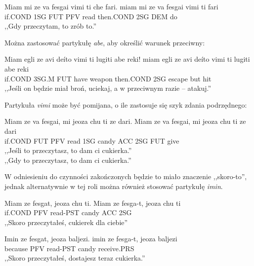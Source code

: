 \begin{spacing}{1.1}
\begin{exe}
	\ex
	\trans Miam mi ze va fesgai vimi ti che fari.
	\gll miam mi ze va fesgai vimi ti fari\\
	  if.COND 1SG FUT PFV read then.COND 2SG DEM do\\
	\glt  ,,Gdy przeczytam, to zrób to.''
\end{exe}

Można zastosować partykułę \emph{abe}, aby określić warunek przeciwny:

\begin{exe}
	\ex
	\trans Miam egli ze avi deíto vimi ti lugiti abe reki! 
	\gll miam egli ze avi deíto vimi ti lugiti abe reki\\
	  if.COND 3SG.M FUT have weapon then.COND 2SG escape but hit\\
	\glt  ,,Jeśli on będzie miał broń, uciekaj, a w przeciwnym razie -- atakuj.''
\end{exe}

Partykuła \emph{vimi} może być pomijana, o ile zastosuje się szyk zdania podrzędnego:

\begin{exe}
	\ex
	\trans Miam ze va fesgai, mi jeoza chu ti ze dari.
	\gll Miam ze va fesgai, mi jeoza chu ti ze dari\\
	  if.COND FUT PFV read 1SG candy ACC 2SG FUT give\\
	\glt  ,,Jeśli to przeczytasz, to dam ci cukierka.'' \\ ,,Gdy to przeczytasz, to dam ci cukierka.''
\end{exe}

W odniesieniu do czynności zakończonych będzie to miało znaczenie ,,skoro-to'',
jednak alternatywnie w tej roli można również stosować partykułę \emph{imin}.

\begin{exe}
	\ex
	\trans Miam ze fesgat, jeoza chu ti.
	\gll Miam ze fesga-t, jeoza chu ti\\
	  if.COND PFV read-PST candy ACC 2SG\\
	\glt  ,,Skoro przeczytałeś, cukierek dla ciebie''
\end{exe}

\begin{exe}
	\ex
	\trans Imin ze fesgat, jeoza baljezi.
	\gll imin ze fesga-t, jeoza baljezi\\
	  because PFV read-PST candy receive.PRS\\
	\glt  ,,Skoro przeczytałeś, dostajesz teraz cukierka.''
\end{exe}


\end{spacing}
